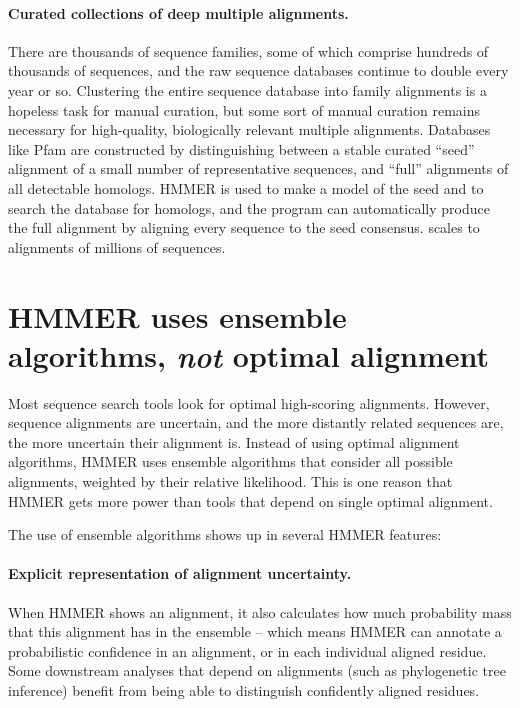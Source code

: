 \paragraph{Curated collections of deep multiple alignments.}  There are thousands of
sequence families, some of which comprise hundreds of thousands of
sequences, and the raw sequence databases continue to double every
year or so. Clustering the entire sequence database into family
alignments is a hopeless task for manual curation, but some sort of
manual curation remains necessary for high-quality, biologically
relevant multiple alignments. Databases like Pfam are constructed by
distinguishing between a stable curated ``seed'' alignment of a small
number of representative sequences, and ``full'' alignments of all
detectable homologs. HMMER is used to make a model of the seed and to
search the database for homologs, and the  program can
automatically produce the full alignment by aligning every sequence to
the seed consensus.  scales to alignments of 
millions of sequences.



\section{HMMER uses ensemble algorithms, \emph{not} optimal alignment}

Most sequence search tools look for optimal high-scoring
alignments. However, sequence alignments are uncertain, and the more
distantly related sequences are, the more uncertain their alignment
is. Instead of using optimal alignment algorithms, HMMER uses ensemble
algorithms that consider all possible alignments, weighted by their
relative likelihood. This is
one reason that HMMER gets more power than tools that depend on single
optimal alignment.

The use of ensemble algorithms shows up in several HMMER features:

\paragraph{Explicit representation of alignment uncertainty.}
  When HMMER shows an alignment, it also calculates how much
  probability mass that this alignment has in the ensemble -- which
  means HMMER can annotate a probabilistic confidence in an alignment,
  or in each individual aligned residue. Some downstream analyses that
  depend on alignments (such as phylogenetic tree inference) benefit
  from being able to distinguish confidently aligned residues.

